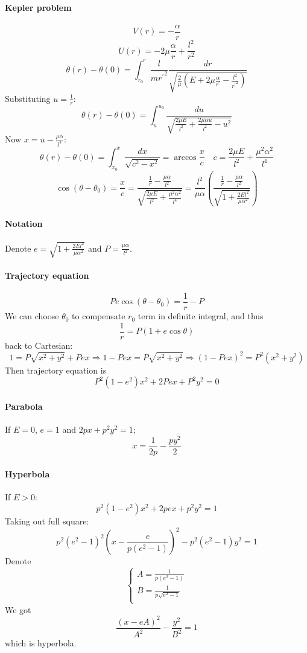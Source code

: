 \paragraph{Kepler problem}
$$V(r) = -\frac{\alpha}{r}$$
$$U(r)= -2\mu \frac{\alpha}{r} + \frac{l^2}{r^2}$$
$$\theta(r) - \theta(0) = \int_{r_0}^r \frac{l}{m{r^\prime}^2} \frac{dr}{ \sqrt{\frac{2}{\mu}\left(E+2\mu \frac{\alpha}{{r^\prime}} - \frac{l^2}{{r^\prime}^2}\right)}} $$
Substituting $u=\frac{1}{r}$:
$$\theta(r) - \theta(0) =  \int_{u}^{u_0} \frac{du}{\sqrt{\frac{2\mu E}{l^2} + \frac{2\mu \alpha u }{l^2} - u^2 }}$$
Now $x = u -\frac{\mu \alpha }{l^2}$:
$$\theta(r) - \theta(0)  = \int_{x_0}^x \frac{dx}{\sqrt{c^2-x^2}} = \arccos \frac{x}{c} \quad c = \frac{2\mu E}{l^2} + \frac{\mu^2 \alpha^2}{l^4}$$
$$\cos \left(\theta - \theta_0\right) = \frac{x}{c} = \frac{  \frac{1}{r} - \frac{\mu \alpha}{l^2}}{\sqrt{\frac{2\mu E}{l^2} + \frac{\mu^2 \alpha^2}{l^4}}} = \frac{l^2}{\mu \alpha} \left( \frac{\frac{1}{r} - \frac{\mu \alpha}{l^2}}{\sqrt{1+ \frac{2El^2}{\mu \alpha^2}}} \right) $$
\paragraph{Notation} Denote $e = \sqrt{1+ \frac{2El^2}{\mu \alpha^2}}$ and $P=\frac{\mu \alpha}{l^2}$.

\paragraph{Trajectory equation}
$$Pe\cos (\theta - \theta_0) = \frac{1}{r} - P$$
We can choose $\theta_0$ to compensate $r_0$ term in definite integral, and thus
$$\frac{1}{r} = P(1+ e\cos \theta)$$
back to Cartesian:
$$1 = P\sqrt{x^2+y^2}+Pex \Rightarrow  1 - Pex = P\sqrt{x^2+y^2} \Rightarrow  (1 - Pex)^2 = P^2(x^2+y^2)$$
Then trajectory equation is
$$P^2(1-e^2)x^2+2Pex+P^2y^2 = 0$$
\paragraph{Parabola}
If $E=0$, $e=1$ and $2px+p^2y^2 = 1$;
$$x = \frac{1}{2p} - \frac{py^2}{2}$$
\paragraph{Hyperbola}
If $E>0$:
$$p^2(1-e^2) x^2 + 2pex + p^2y^2 = 1$$
Taking out full square:
$$p^2(e^2-1)^2 \left( x - \frac{e}{p(e^2-1)} \right)^2 - p^2 (e^2-1) y^2 = 1$$
Denote
$$\begin{cases}
A = \frac{1}{p(e^2-1)}\\
B = \frac{1}{p\sqrt{e^2-1}}\\
\end{cases}$$
We got
$$\frac{(x-eA)^2}{A^2} - \frac{y^2}{B^2} = 1$$
which is hyperbola.
